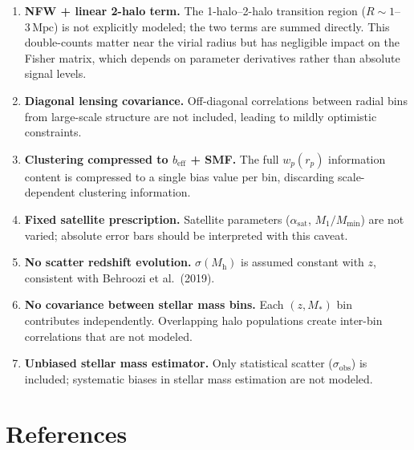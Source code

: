 \documentclass[12pt, letterpaper]{article}
\newcommand{\Mh}{M_\mathrm{h}}
\newcommand{\Mstar}{M_*}
\newcommand{\beff}{b_\mathrm{eff}}
\newcommand{\sobs}{\sigma_\mathrm{obs}}
\begin{document}
\begin{enumerate}
    \item \textbf{NFW + linear 2-halo term.}
    The 1-halo--2-halo transition region ($R \sim 1$--$3\,\mathrm{Mpc}$)
    is not explicitly modeled; the two terms are summed directly. This
    double-counts matter near the virial radius but has negligible
    impact on the Fisher matrix, which depends on parameter derivatives
    rather than absolute signal levels.

    \item \textbf{Diagonal lensing covariance.}
    Off-diagonal correlations between radial bins from large-scale
    structure are not included, leading to mildly optimistic
    constraints.

    \item \textbf{Clustering compressed to $\beff$ + SMF.}
    The full $w_p(r_p)$ information content is compressed to a single
    bias value per bin, discarding scale-dependent clustering
    information.

    \item \textbf{Fixed satellite prescription.}
    Satellite parameters ($\alpha_\mathrm{sat}$, $M_1/M_\mathrm{min}$)
    are not varied; absolute error bars should be interpreted with
    this caveat.

    \item \textbf{No scatter redshift evolution.}
    $\sigma(\Mh)$ is assumed constant with $z$, consistent with
    Behroozi et al.\ (2019).

    \item \textbf{No covariance between stellar mass bins.}
    Each $(z, \Mstar)$ bin contributes independently. Overlapping halo
    populations create inter-bin correlations that are not modeled.

    \item \textbf{Unbiased stellar mass estimator.}
    Only statistical scatter ($\sobs$) is included; systematic biases
    in stellar mass estimation are not modeled.
\end{enumerate}


\section*{References}
\label{sec:references}
\end{document}
